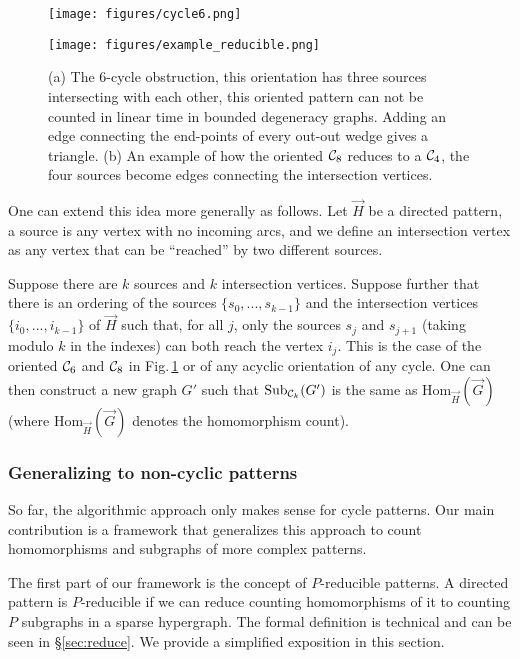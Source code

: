 \documentclass[a4paper,UKenglish,cleveref, autoref, numberwithinsect, thm-restate]{lipics-v2021}
\newcommand{\reducible}[1]{${#1}$-reducible}
\newcommand{\cycle}[1]{\cC_{#1}}
\newcommand{\Hom}[2]{\mathrm{Hom}_{#2}(#1)}
\newcommand{\Sub}[2]{\mathrm{Sub}_{#2}(#1)}
\newcommand{\cC}{{\cal C}}
\newcommand{\Sec}[1]{\S \ref{sec:#1}} \newcommand{\Eqn}[1]{\hyperref[eq:#1]{(\ref*{eq:#1})}} \newcommand{\Fig}[1]{{Fig.\,\ref{fig:#1}}} \newcommand{\Tab}[1]{\hyperref[tab:#1]{Tab.\,\ref*{tab:#1}}} \newcommand{\Table}[1]{\hyperref[tab:#1]{Table\,\ref*{tab:#1}}} \newcommand{\Thm}[1]{\hyperref[thm:#1]{Theorem\,\ref*{thm:#1}}} \newcommand{\Fact}[1]{\hyperref[fact:#1]{Fact\,\ref*{fact:#1}}} \newcommand{\Lem}[1]{\hyperref[lem:#1]{Lemma\,\ref*{lem:#1}}} \newcommand{\Prop}[1]{\hyperref[prop:#1]{Prop.~\ref*{prop:#1}}} \newcommand{\Cor}[1]{\hyperref[cor:#1]{Corollary~\ref*{cor:#1}}} \newcommand{\Conj}[1]{\hyperref[conj:#1]{Conjecture~\ref*{conj:#1}}} \newcommand{\Def}[1]{\hyperref[def:#1]{Definition~\ref*{def:#1}}} \newcommand{\Alg}[1]{\hyperref[alg:#1]{Alg.~\ref*{alg:#1}}} \newcommand{\Clm}[1]{\hyperref[clm:#1]{Claim~\ref*{clm:#1}}} \newcommand{\Obs}[1]{\hyperref[obs:#1]{Observation~\ref*{obs:#1}}} \newcommand{\Rem}[1]{\hyperref[rem:#1]{Remark~\ref*{rem:#1}}} \newcommand{\Con}[1]{\hyperref[con:#1]{Construction~\ref*{con:#1}}} \newcommand{\Step}[1]{\hyperref[step:#1]{Step~\ref*{step:#1}}} \newcommand{\Assumption}[1]{\hyperref[assm:#1]{Assumption\,\ref*{assm:#1}}}
\begin{document}
	\begin{figure}[t]
		\centering
		\begin{minipage}{.47\linewidth}
			\centering
			\texttt{[image: figures/cycle6.png]}
		\end{minipage}
		\hspace{0.5cm}
		\begin{minipage}{.47\linewidth}
			\centering
			\texttt{[image: figures/example\_reducible.png]}
		\end{minipage}
		\caption{(a) The $6$-cycle obstruction, this orientation has three sources intersecting with each other, this oriented pattern can not be counted in linear time in bounded degeneracy graphs. Adding an edge connecting the end-points of every out-out wedge gives a triangle. (b) An example of how the oriented $\cycle{8}$ reduces to a $\cycle{4}$, the four sources become edges connecting the intersection vertices.} 
		\label{fig:cycles}
	\end{figure}
	
	One can extend this idea more generally as follows. 
	Let $\vec{H}$ be a directed pattern, a source is any vertex with no incoming arcs, and we define an intersection vertex as any vertex that can be ``reached'' by two different sources.
	
	Suppose there are $k$ sources and $k$ intersection vertices. Suppose further that there is an ordering of the sources $\{s_0,...,s_{k-1}\}$ and the intersection vertices $\{i_0,...,i_{k-1}\}$ of $\vec{H}$ such that, for all $j$, only the sources $s_j$ and $s_{j+1}$ (taking modulo $k$ in the indexes) can both reach the vertex $i_j$.
	This is the case of the oriented $\cycle{6}$ and $\cycle{8}$ in \Fig{cycles} or of any acyclic orientation of any cycle.
	One can then construct a new graph $G'$ such that $\Sub{G'}{\cycle{k}}$ is the same as $\Hom{\vec{G}}{\vec{H}}$ (where $\Hom{\vec{G}}{\vec{H}}$ denotes the homomorphism count). 
	
	
	\subsubsection{Generalizing to non-cyclic patterns}
	
	So far, the algorithmic approach only makes sense for cycle patterns. Our main contribution is a framework that generalizes this approach to count homomorphisms and subgraphs of more complex patterns. 
	
	The first part of our framework is the concept of \reducible{P} patterns. A directed pattern is \reducible{P} if we can reduce counting homomorphisms of it to counting $P$ subgraphs in a sparse hypergraph. The formal definition is technical and can be seen in \Sec{reduce}. We provide a simplified exposition in this section.
	
\end{document}
